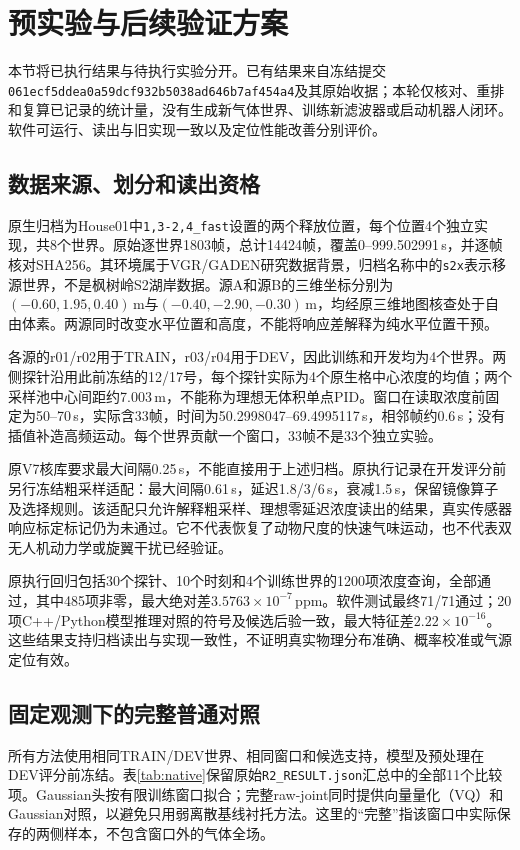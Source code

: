 \section{预实验与后续验证方案}
\label{sec:experiments}
本节将已执行结果与待执行实验分开。已有结果来自冻结提交\texttt{061ecf5ddea0a59dcf932b5038ad646b7af454a4}及其原始收据；本轮仅核对、重排和复算已记录的统计量，没有生成新气体世界、训练新滤波器或启动机器人闭环。软件可运行、读出与旧实现一致以及定位性能改善分别评价。

\subsection{数据来源、划分和读出资格}
原生归档为House01中\texttt{1,3-2,4\_fast}设置的两个释放位置，每个位置4个独立实现，共8个世界。原始逐世界1803帧，总计14424帧，覆盖0--999.502991\,s，并逐帧核对SHA256。其环境属于VGR/GADEN研究数据背景，归档名称中的\texttt{s2x}表示移源世界，不是枫树岭S2湖岸数据。源A和源B的三维坐标分别为$(-0.60,1.95,0.40)$\,m与$(-0.40,-2.90,-0.30)$\,m，均经原三维地图核查处于自由体素。两源同时改变水平位置和高度，不能将响应差解释为纯水平位置干预。

各源的r01/r02用于TRAIN，r03/r04用于DEV，因此训练和开发均为4个世界。两侧探针沿用此前冻结的12/17号，每个探针实际为4个原生格中心浓度的均值；两个采样池中心间距约7.003\,m，不能称为理想无体积单点PID。窗口在读取浓度前固定为50--70\,s，实际含33帧，时间为50.2998047--69.4995117\,s，相邻帧约0.6\,s；没有插值补造高频运动。每个世界贡献一个窗口，33帧不是33个独立实验。

原V7核库要求最大间隔0.25\,s，不能直接用于上述归档。原执行记录在开发评分前另行冻结粗采样适配：最大间隔0.61\,s，延迟1.8/3/6\,s，衰减1.5\,s，保留镜像算子及选择规则。该适配只允许解释粗采样、理想零延迟浓度读出的结果，真实传感器响应标定标记仍为未通过。它不代表恢复了动物尺度的快速气味运动，也不代表双无人机动力学或旋翼干扰已经验证。

原执行回归包括30个探针、10个时刻和4个训练世界的1200项浓度查询，全部通过，其中485项非零，最大绝对差$3.5763\times10^{-7}$\,ppm。软件测试最终71/71通过；20项C++/Python模型推理对照的符号及候选后验一致，最大特征差$2.22\times10^{-16}$。这些结果支持归档读出与实现一致性，不证明真实物理分布准确、概率校准或气源定位有效。

\subsection{固定观测下的完整普通对照}
所有方法使用相同TRAIN/DEV世界、相同窗口和候选支持，模型及预处理在DEV评分前冻结。表\ref{tab:native}保留原始\texttt{R2\_RESULT.json}汇总中的全部11个比较项。Gaussian头按有限训练窗口拟合；完整raw-joint同时提供向量量化（VQ）和Gaussian对照，以避免只用弱离散基线衬托方法。这里的“完整”指该窗口中实际保存的两侧样本，不包含窗口外的气体全场。


